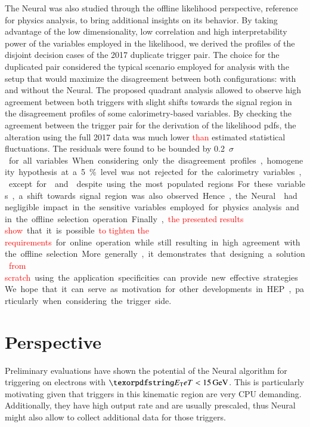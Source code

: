 The Neural\rnn{} was also studied through the offline likelihood perspective,
reference for physics analysis, to bring additional insights on its behavior. By
taking advantage of the low dimensionality, low correlation and high
interpretability power of the variables employed in the likelihood, we derived
the profiles of the disjoint decision cases of the 2017 duplicate trigger pair.
The choice for the duplicated pair considered the typical scenario employed for
analysis with the setup that would maximize the disagreement between both
configurations: with and without the Neural\rnn{}. The proposed quadrant analysis
allowed to observe high agreement between both triggers with slight shifts
towards the signal region in the disagreement profiles of some calorimetry-based
variables. By checking the agreement between the trigger pair for the derivation
of the likelihood pdfs, the alteration using the full 2017 data was much lower
\textcolor{red}{than} estimated statistical fluctuations. The residuals were found to be bounded
by \SI{0.2}{$\sigma$} for all variables. When considering only the
disagreement profiles, homogeneity hypothesis at a \SI{5}{\%} level was not
rejected for the calorimetry variables, except for \reta{} and \rhad{} despite
using the most populated regions. For these variables, a shift towards signal
region was also observed. Hence, the Neural\rnn{} had negligible impact in the
sensitive variables employed for physics analysis and in the offline selection
operation.

Finally, \textcolor{red}{the presented results show} that it is possible \textcolor{red}{to tighten the requirements} for online operation while still resulting in high agreement with the offline
selection. More generally, it demonstrates that designing a solution \textcolor{red}{from scratch} using the application specificities can provide new effective
strategies. We hope that it can serve as motivation for other developments in
HEP, particularly when considering the trigger side.

\section{Perspective}







Preliminary evaluations have shown the potential of the Neural\rnn{} algorithm for
triggering on electrons with $\et<\SI{15}{\GeV}$. This is particularly motivating given that triggers in this kinematic region are very
CPU demanding. Additionally, they have high output rate and are usually
prescaled, thus Neural\rnn{} might also allow to collect additional data for those
triggers.


